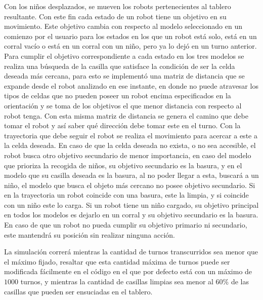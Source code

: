 \documentclass[titlepage,11pt]{scrartcl}
\begin{document}
Con los niños desplazados, se mueven los robots pertenecientes al tablero resultante. Con este fin cada estado de un robot tiene un objetivo en su movimiento. Este objetivo cambia con respecto al modelo seleccionado en un comienzo por el usuario para los estados en los que un robot está solo, está en un corral vacío o está en un corral con un niño, pero ya lo dejó en un turno anterior. Para cumplir el objetivo correspondiente a cada estado en los tres modelos se realiza una búsqueda de la casilla que satisface la condición de ser la celda deseada más cercana, para esto se implementó una matriz de distancia que se expande desde el robot analizado en ese instante, en donde no puede atravesar los tipos de celdas que no pueden poseer un robot encima especificados en la orientación y se toma de los objetivos el que menor distancia con respecto al robot tenga. Con esta misma matriz de distancia se genera el camino que debe tomar el robot y así saber qué dirección debe tomar este en el turno. Con la trayectoria que debe seguir el robot se realiza el movimiento para acercar a este a la celda deseada. En caso de que la celda deseada no exista, o no sea accesible, el robot busca otro objetivo secundario de menor importancia, en caso del modelo que prioriza la recogida de niños, su objetivo secundario es la basura, y en el modelo que su casilla deseada es la basura, al no poder llegar a esta, buscará a un niño, el modelo que busca el objeto más cercano no posee objetivo secundario. Si en la trayectoria un robot coincide con una basura, este la limpia, y si coincide con un niño este lo carga. Si un robot tiene un niño cargado, su objetivo principal en todos los modelos es dejarlo en un corral y su objetivo secundario es la basura. En caso de que un robot no pueda cumplir su objetivo primario ni secundario, este mantendrá su posición sin realizar ninguna acción.

La simulación correrá mientras la cantidad de turnos transcurridos sea menor que el máximo fijado, resaltar que esta cantidad máxima de turnos puede ser modificada fácilmente en el código en el que por defecto está con un máximo de $1000$ turnos, y mientras la cantidad de casillas limpias sea menor al 60\% de las casillas que pueden ser ensuciadas en el tablero.
\end{document}
